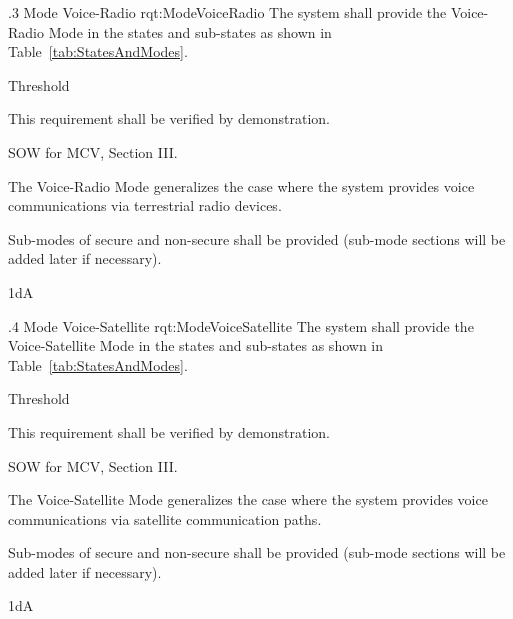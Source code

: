 \ONERQMTVKSA
{\RqtNumberBase.3}
{Mode Voice-Radio}
{rqt:ModeVoiceRadio}
{The system shall provide the Voice-Radio Mode in the states and sub-states as shown in Table~\ref{tab:StatesAndModes}.}
{
	\item [Phase 1] Threshold
}
{This requirement shall be verified by demonstration.}
{
	\item [\cite{ref:MCV_SOW}] SOW for MCV, Section III.
}
{
	\item The Voice-Radio Mode generalizes the case where the system provides voice communications via terrestrial radio devices.
	\item Sub-modes of secure and non-secure shall be provided (sub-mode sections will be added later if necessary).
}
{1dA}


\ONERQMTVKSA
{\RqtNumberBase.4}
{Mode Voice-Satellite}
{rqt:ModeVoiceSatellite}
{The system shall provide the Voice-Satellite Mode in the states and sub-states as shown in Table~\ref{tab:StatesAndModes}.}
{
	\item [Phase 1] Threshold
}
{This requirement shall be verified by demonstration.}
{
	\item [\cite{ref:MCV_SOW}] SOW for MCV, Section III.
}
{
	\item The Voice-Satellite Mode generalizes the case where the system provides voice communications via satellite communication paths.
	\item Sub-modes of secure and non-secure shall be provided (sub-mode sections will be added later if necessary).
}
{1dA}



